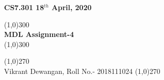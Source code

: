 \documentclass[11pt]{article}
\begin{document}
	\begin{titlepage}
		\begin{flushleft}
			
			\bf CS7.301
			\hfill
			\bfseries 18$^{th}$ April, 2020
		\end{flushleft}
		\begin{center}
			\line(1,0){300}\\
			[5mm]
			\huge{\bfseries MDL Assignment-4}\\
			\line(1,0){300}\\
			[12cm]
		\end{center}
		\begin{flushright}
			{
				\line(1,0){270}\\
				\large  Vikrant Dewangan, Roll No.- 2018111024
				\line(1,0){270}\\	
			}
		\end{flushright}
	\end{titlepage}
	\newpage
	\tableofcontents
	\newpage
\end{document}
